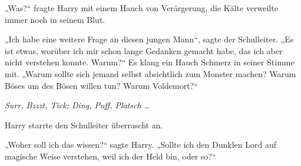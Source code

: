 „Was?“ fragte Harry mit einem Hauch von Verärgerung, die Kälte verweilte immer noch in seinem Blut.

„Ich habe eine weitere Frage an diesen jungen Mann“, sagte der Schulleiter.
„Es ist etwas, worüber ich mir schon lange Gedanken gemacht habe, das ich aber nicht verstehen konnte. Warum?“ Es klang ein Hauch Schmerz in seiner Stimme mit.
„Warum sollte sich jemand selbst absichtlich zum Monster machen? Warum Böses um des Bösen willen tun? Warum Voldemort?“

\later

\emph{Surr, Bzzzt, Tick; Ding, Puff, Platsch …}

Harry starrte den Schulleiter überrascht an.

„Woher soll ich das wissen?“ sagte Harry.
„Sollte ich den Dunklen Lord auf magische Weise verstehen, weil ich der Held bin, oder so?“


